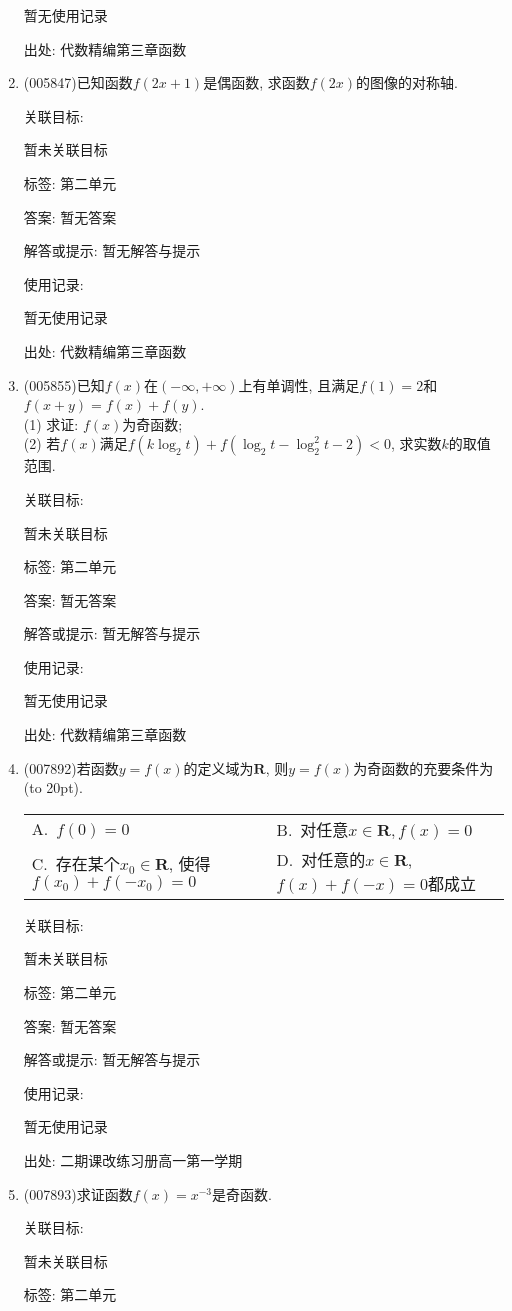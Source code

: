 \documentclass[10pt,a4paper]{article}
\newcommand{\bracket}[1]{(\hbox to #1pt{})}
\newcommand{\twoch}[4]{\par\begin{tabular}{p{.46\textwidth}p{.46\textwidth}}
A.~#1& B.~#2\\
C.~#3& D.~#4
\end{tabular}}
\begin{document}
\begin{enumerate}[1.]
暂无使用记录


出处: 代数精编第三章函数
\item { (005847)}已知函数$f(2x+1)$是偶函数, 求函数$f(2x)$的图像的对称轴.


关联目标:

暂未关联目标



标签: 第二单元

答案: 暂无答案

解答或提示: 暂无解答与提示

使用记录:

暂无使用记录


出处: 代数精编第三章函数
\item { (005855)}已知$f(x)$在$(-\infty ,+\infty)$上有单调性, 且满足$f(1)=2$和$f(x+y)=f(x)+f(y)$.\\
(1) 求证: $f(x)$为奇函数;\\
(2) 若$f(x)$满足$f(k\log_2t)+f(\log_2t-\log_2^2t-2)<0$, 求实数$k$的取值范围.


关联目标:

暂未关联目标



标签: 第二单元

答案: 暂无答案

解答或提示: 暂无解答与提示

使用记录:

暂无使用记录


出处: 代数精编第三章函数
\item { (007892)}若函数$y=f(x)$的定义域为$\mathbf{R}$, 则$y=f(x)$为奇函数的充要条件为\bracket{20}.
\twoch{$f(0)=0$}{对任意$x\in \mathbf{R},f(x)=0$}{存在某个$x_0\in \mathbf{R}$, 使得$f(x_0)+f(-x_0)=0$}{对任意的$x\in \mathbf{R}$, $f(x)+f(-x)=0$都成立}


关联目标:

暂未关联目标



标签: 第二单元

答案: 暂无答案

解答或提示: 暂无解答与提示

使用记录:

暂无使用记录


出处: 二期课改练习册高一第一学期
\item { (007893)}求证函数$f(x)=x^{-3}$是奇函数.


关联目标:

暂未关联目标



标签: 第二单元


\end{enumerate}
\end{document}
